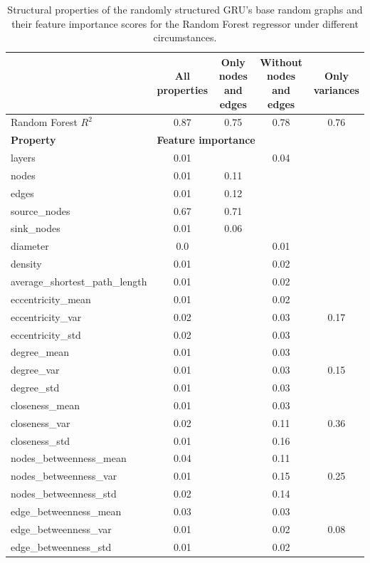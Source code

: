 \begin{table}[h]
	\centering
	\begin{tabular}{|l|c|c|c|c|}
	    \hline
		 & \shortstack{\textbf{All}\\\textbf{ properties}} & \shortstack{\textbf{Only nodes}\\\textbf{ and edges}} & \shortstack{\textbf{Without nodes}\\\textbf{ and edges}} & \shortstack{\textbf{Only}\\\textbf{ variances}}\\
		\hline
		Random Forest $R^{2}$ & 0.87 & 0.75 & 0.78 & 0.76\\
		\hline\hline
		\textbf{Property} & \multicolumn{4}{|l|}{\textbf{Feature importance}}\\
		\hline
		layers & 0.01 & & 0.04 & \\
        nodes & 0.01 & 0.11 & & \\
        edges & 0.01 & 0.12 & & \\
        source\_nodes & 0.67 & 0.71 & & \\
        sink\_nodes & 0.01 & 0.06 & & \\
        diameter & 0.0 & & 0.01 & \\
        density & 0.01 & & 0.02 & \\
        average\_shortest\_path\_length & 0.01 & & 0.02 & \\
        eccentricity\_mean & 0.01 & & 0.02 & \\
        eccentricity\_var & 0.02 & & 0.03 & 0.17 \\
        eccentricity\_std & 0.02 & & 0.03 & \\
        degree\_mean & 0.01 & & 0.03 & \\
        degree\_var & 0.01 & & 0.03 & 0.15 \\
        degree\_std & 0.01 & & 0.03 & \\
        closeness\_mean & 0.01 & & 0.03 & \\
        closeness\_var & 0.02 & & 0.11 & 0.36 \\
        closeness\_std & 0.01 & & 0.16 & \\
        nodes\_betweenness\_mean & 0.04 & & 0.11 & \\
        nodes\_betweenness\_var & 0.01 & & 0.15 & 0.25 \\
        nodes\_betweenness\_std & 0.02 & & 0.14 & \\
        edge\_betweenness\_mean & 0.03 & & 0.03 & \\
        edge\_betweenness\_var & 0.01 & & 0.02 & 0.08 \\
        edge\_betweenness\_std & 0.01 & & 0.02 & \\
		\hline
	\end{tabular}
	\caption[GRU - Feature importance scores for the Random Forest regressor under different circumstances]{Structural properties of the randomly structured GRU's base random graphs and their feature importance scores for the Random Forest regressor under different circumstances.}
	\label{tab:gru_fis}
\end{table}

